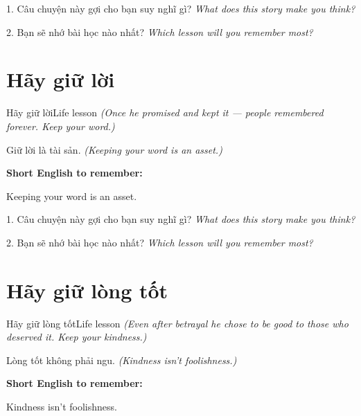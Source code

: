 \begin{tuhocnhanh}
1. Câu chuyện này gợi cho bạn suy nghĩ gì? \textit{What does this story make you think?}

2. Bạn sẽ nhớ bài học nào nhất? \textit{Which lesson will you remember most?}
\end{tuhocnhanh}
\ngancach


\section{Hãy giữ lời}
\begin{truyen}{Hãy giữ lời}{Life lesson}
\textit{(Once he promised and kept it — people remembered forever. Keep your word.)}
\end{truyen}

\begin{baihoc}
Giữ lời là tài sản.
\textit{(Keeping your word is an asset.)}
\end{baihoc}

\begin{ghinhoanh}
\textbf{Short English to remember:}

Keeping your word is an asset.

\end{ghinhoanh}

\begin{tuhocnhanh}
1. Câu chuyện này gợi cho bạn suy nghĩ gì? \textit{What does this story make you think?}

2. Bạn sẽ nhớ bài học nào nhất? \textit{Which lesson will you remember most?}
\end{tuhocnhanh}
\ngancach


\section{Hãy giữ lòng tốt}
\begin{truyen}{Hãy giữ lòng tốt}{Life lesson}
\textit{(Even after betrayal he chose to be good to those who deserved it. Keep your kindness.)}
\end{truyen}

\begin{baihoc}
Lòng tốt không phải ngu.
\textit{(Kindness isn't foolishness.)}
\end{baihoc}

\begin{ghinhoanh}
\textbf{Short English to remember:}

Kindness isn't foolishness.

\end{ghinhoanh}

